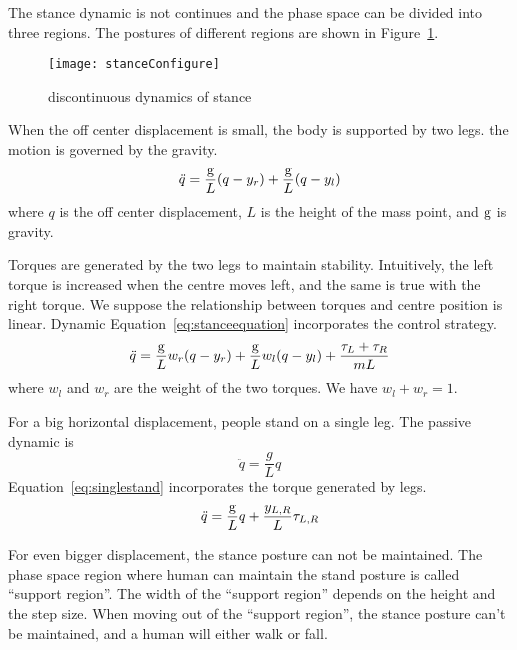The stance dynamic is not continues and the phase space can be divided into three regions.
The postures of different regions are shown in Figure~\ref{fig:phaseregionsofstance}.

\begin{figure}[!htbp]
  \begin{center}
     \texttt{[image: stanceConfigure]}
    \caption{discontinuous dynamics of stance}
    \label{fig:phaseregionsofstance}
\end{center}
\end{figure}


\begin{itemize}
When the off center  displacement  is small, the body is supported by two legs.
the motion is governed by the gravity.
\[
\ddot{q}=\frac{\mathrm{g}}{L}(q-y_r)+\frac{\mathrm{g}}{L}(q-y_l)
\]
where $q$ is the off center displacement,
$L$ is the height of the mass point, 
and $\mathrm{g}$ is gravity.



Torques are generated by the two legs to maintain stability.
Intuitively, the left torque is increased when the centre moves left, and the same is true with the right torque.
We suppose the relationship between torques and centre position is linear.
Dynamic Equation~\ref{eq:stanceequation} incorporates the control strategy.
\begin{equation}
\label{eq:stanceequation}
\ddot{q}=\frac{\mathrm{g}}{L}w_r(q-y_r)+\frac{\mathrm{g}}{L}w_l(q-y_l)+\frac{\tau_L+\tau_R}{mL}
\end{equation}
where $w_l$ and $w_r$ are the weight of the two torques. 
We have $w_l+w_r=1$.


For a big horizontal  displacement,  people stand on a single leg.
The passive dynamic is
\[
\ddot{q}=\frac{g}{L}q
\]
Equation~\ref{eq:singlestand} incorporates the torque generated by legs.
\begin{equation}
\label{eq:singlestand}
\ddot{q}=\frac{\mathrm{g}}{L}q+\frac{y_{L,R}}{L}\tau_{L,R}
\end{equation}

For even bigger displacement,  the stance posture can not be maintained.
The phase space region where human can maintain the stand posture is called ``support region''.
The width of the ``support region'' depends on the  height and the step size.
When moving out of the ``support region'', the stance posture can't be maintained, and a human will either walk or fall.
\end{itemize}







